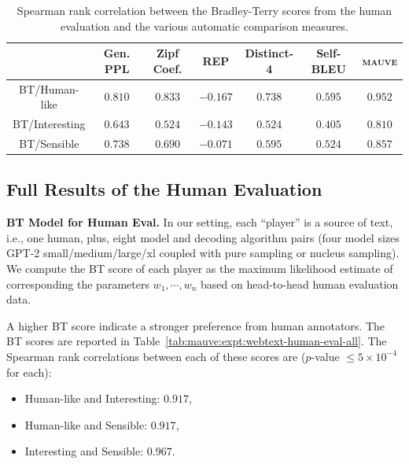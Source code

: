 \documentclass{article}
\newcommand{\myparagraph}[1]{\par\noindent\textbf{{#1}.}} %
\theoremstyle{definition}
\newcommand{\tabemph}[1]{\cellcolor{lightmauve!30}\textcolor{black!50!royalazure}{#1}}%
\begin{document}
\begin{table}[t!]
\centering
\begin{adjustbox}{max width=0.99\textwidth}
{\small 
\begin{tabular}{ccccccc}
\toprule
{} & Gen. PPL & Zipf Coef. &       REP & Distinct-4 & Self-BLEU & \textsc{mauve} \\
\midrule
BT/Human-like  &  $0.810$ &    $0.833$ &  $-0.167$ &    $0.738$ &   $0.595$ &        \tabemph{$\mathbf{0.952}$} \\
BT/Interesting &  $0.643$ &    $0.524$ &  $-0.143$ &    $0.524$ &   $0.405$ &        \tabemph{$\mathbf{0.810}$} \\
BT/Sensible    &  $0.738$ &    $0.690$ &  $-0.071$ &    $0.595$ &   $0.524$ &        \tabemph{$\mathbf{0.857}$} \\
\bottomrule
\end{tabular}
 }
\end{adjustbox}
\caption{Spearman rank correlation between 
the Bradley-Terry scores from the human evaluation 
and the various automatic comparison measures.
}
\label{tab:mauve:expt:webtext-human-eval-all-corr}
\end{table}


\subsection{Full Results of the Human Evaluation}
\label{sec:a:human-eval:results}

\myparagraph{BT Model for Human Eval}
In our setting, each ``player'' is
a source of text, i.e., 
one human, plus, 
eight model and decoding algorithm pairs
(four model sizes GPT-2 small/medium/large/xl
coupled with pure sampling or nucleus sampling). 
We compute the BT score of each player 
as the maximum likelihood estimate of 
corresponding the parameters $w_1,\cdots, w_n$
based on head-to-head human evaluation data.

A higher BT score indicate a stronger preference 
from human annotators.
The BT scores are reported in Table~\ref{tab:mauve:expt:webtext-human-eval-all}.
The Spearman rank correlations between 
each of these scores are
($p$-value $\le 5\times 10^{-4}$ for each):
\begin{itemize}[itemsep=0cm,leftmargin=0.5cm]
    \item Human-like and Interesting: $0.917$,
    \item Human-like and Sensible: $0.917$,
    \item Interesting and Sensible: $0.967$.
\end{itemize}
\end{document}
